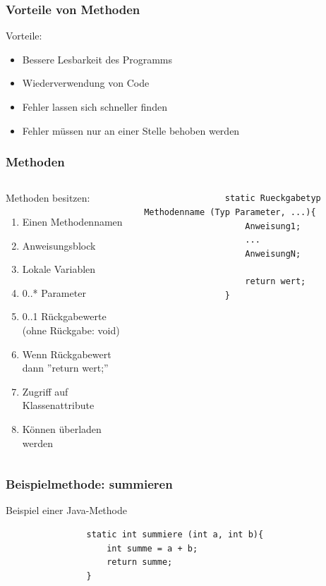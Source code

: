 \begin{frame}[fragile]
	  	\frametitle{Vorteile von Methoden}
		Vorteile:
		\begin{itemize}
		  \item Bessere Lesbarkeit des Programms
		  \item Wiederverwendung von Code
		  \item Fehler lassen sich schneller finden
		  \item Fehler müssen nur an einer Stelle behoben werden
		\end{itemize}
\end{frame}

\begin{frame}[fragile]
	  \frametitle{Methoden}
		 \begin{columns}
		 \begin{column}{0.5\textwidth}
			  \small
			  Methoden besitzen:
			  \begin{enumerate}
			  	\item Einen Methodennamen
			  	\item Anweisungsblock
			  	\item Lokale Variablen
			  	\item 0..* Parameter
			  	\item 0..1 R\"uckgabewerte (ohne R\"uckgabe: void)
			  	\item Wenn R\"uckgabewert dann ''return wert;''
			  	\item Zugriff auf Klassenattribute
			  	\item K\"onnen \"uberladen werden
			  \end{enumerate}
		 \end{column}
		 \begin{column}{0.5\textwidth}
		 	\begin{lstlisting}
		 		static Rueckgabetyp Methodenname (Typ Parameter, ...){
		 			Anweisung1;
		 			...
		 			AnweisungN;
		 			
		 			return wert;
		 		}
		 	\end{lstlisting}
		 \end{column}
		 \end{columns}
\end{frame}

\begin{frame}[fragile]
	  \frametitle{Beispielmethode: summieren}
			Beispiel einer Java-Methode
		 	\begin{lstlisting}
		 		static int summiere (int a, int b){
		 			int summe = a + b;
		 			return summe;
		 		}
		 	\end{lstlisting}
\end{frame}

